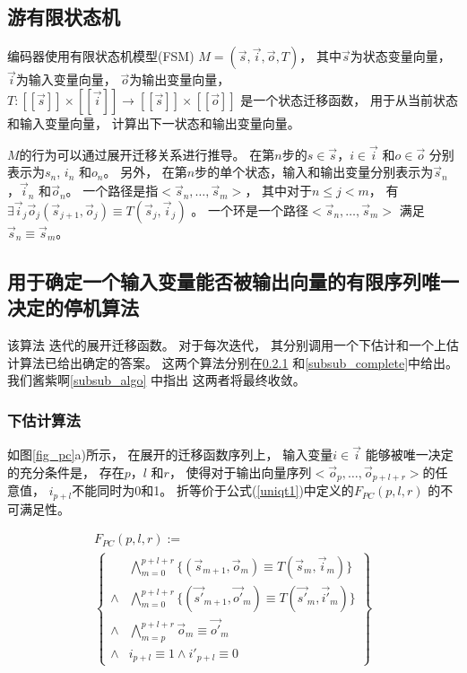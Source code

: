 \subsection{游有限状态机}\label{subsec_fsm}


编码器使用有限状态机模型(FSM) $M=(\vec{s},\vec{i},\vec{o},T)$，
其中$\vec{s}$为状态变量向量，
$\vec{i}$为输入变量向量，
$\vec{o}$为输出变量向量，
$T: [\![\vec{s}]\!]\times [\![\vec{i}]\!]\to [\![\vec{s}]\!]\times [\![\vec{o}]\!]$
是一个状态迁移函数，
用于从当前状态和输入变量向量，
计算出下一状态和输出变量向量。

$M$的行为可以通过展开迁移关系进行推导。
在第$n$步的$s\in\vec{s}$，$i\in\vec{i}$ 和$o\in\vec{o}$ 
分别表示为$s_n$, $i_n$ 和$o_n$。
另外，
在第$n$步的单个状态，输入和输出变量分别表示为$\vec{s}_n$，$\vec{i}_n$ 和$\vec{o}_n$。
一个路径是指$<\vec{s}_n,\dots,\vec{s}_m>$，
其中对于$n\le j< m$，
有$\exists \vec{i}_j\vec{o}_j (\vec{s}_{j+1},\vec{o}_j)\equiv T(\vec{s}_j,\vec{i}_j)$ 。
一个环是一个路径$<\vec{s}_n,\dots,\vec{s}_m>$ 满足$\vec{s}_n\equiv \vec{s}_m$。

\subsection{用于确定一个输入变量能否被输出向量的有限序列唯一决定的停机算法}\label{subsec_chkextdec}

该算法\cite{ShenTCAD11} 迭代的展开迁移函数。
对于每次迭代，
其分别调用一个下估计和一个上估计算法已给出确定的答案。
这两个算法分别在\ref{subsub_sound} 和\ref{subsub_complete}中给出。
我们酱紫啊\ref{subsub_algo} 中指出
这两者将最终收敛。

\subsubsection{下估计算法}\label{subsub_sound}

如图\ref{fig_pc}a)所示，
在展开的迁移函数序列上，
输入变量$i\in\vec{i}$ 能够被唯一决定的充分条件是，
存在$p$，$l$ 和$r$，
使得对于输出向量序列$<\vec{o}_p,\dots,\vec{o}_{p+l+r}>$的任意值，
$i_{p+l}$不能同时为0和1。
折等价于公式(\ref{uniqt1})中定义的$F_{PC}(p,l,r)$ 的不可满足性。

\begin{multline}\label{uniqt1}
F_{PC}(p,l,r):=\\
\left\{
\begin{array}{cc}
&\bigwedge_{m=0}^{p+l+r}
\{
(\vec{s}_{m+1},\vec{o}_m)\equiv T(\vec{s}_m,\vec{i}_m)
\}
\\
\wedge&\bigwedge_{m=0}^{p+l+r}
\{
(\vec{s'}_{m+1},\vec{o'}_m)\equiv T(\vec{s'}_m,\vec{i'}_m)
\}
\\
\wedge&\bigwedge_{m=p}^{p+l+r}\vec{o}_m\equiv \vec{o'}_m \\
\wedge& i_{p+l}\equiv 1 \wedge  i'_{p+l}\equiv 0
\end{array}
\right\}
\end{multline}



